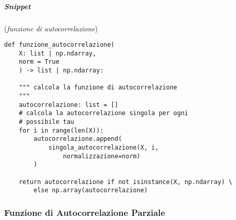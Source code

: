 \subparagraph*{Snippet} (\textit{funzione di autocorrelazione})
\begin{verbatim}
def funzione_autocorrelazione(
    X: list | np.ndarray,
    norm = True
    ) -> list | np.ndarray:
    
    """ calcola la funzione di autocorrelazione
    """
    autocorrelazione: list = []
    # calcola la autocorrelazione singola per ogni
    # possibile tau
    for i in range(len(X)):
        autocorrelazione.append(
            singola_autocorrelazione(X, i, 
                normalizzazione=norm)
        )

    return autocorrelazione if not isinstance(X, np.ndarray) \
        else np.array(autocorrelazione)
\end{verbatim}

\begin{esempio}
    
\end{esempio}

\begin{esempio}
    
\end{esempio}



\subsubsection{Funzione di Autocorrelazione Parziale}